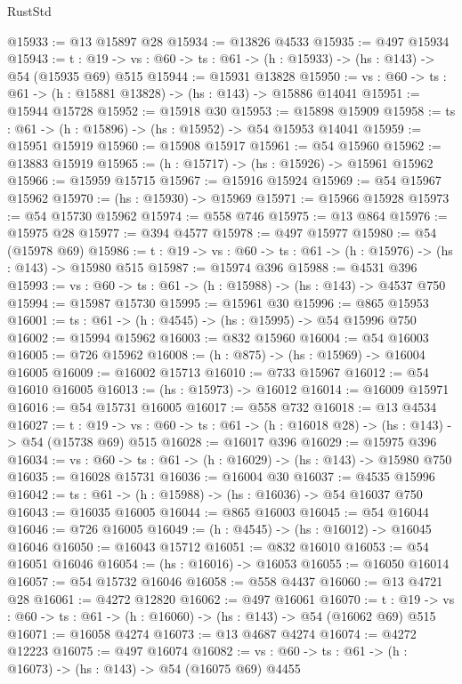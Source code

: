 \begin{lexlean}{RustStd}
\begin{coremodule}
@15933 := @13 @15897 @28
@15934 := @13826 @4533
@15935 := @497 @15934
@15943 := {t : @19} ->
  {vs : @60} -> {ts : @61} -> (h : @15933) -> (hs : @143) -> @54 (@15935 @69) @515
@15944 := @15931 @13828
@15950 := {vs : @60} -> {ts : @61} -> (h : @15881 @13828) -> (hs : @143) -> @15886 @14041
@15951 := @15944 @15728
@15952 := @15918 @30
@15953 := @15898 @15909
@15958 := {ts : @61} -> (h : @15896) -> (hs : @15952) -> @54 @15953 @14041
@15959 := @15951 @15919
@15960 := @15908 @15917
@15961 := @54 @15960
@15962 := @13883 @15919
@15965 := (h : @15717) -> (hs : @15926) -> @15961 @15962
@15966 := @15959 @15715
@15967 := @15916 @15924
@15969 := @54 @15967 @15962
@15970 := (hs : @15930) -> @15969
@15971 := @15966 @15928
@15973 := @54 @15730 @15962
@15974 := @558 @746
@15975 := @13 @864
@15976 := @15975 @28
@15977 := @394 @4577
@15978 := @497 @15977
@15980 := @54 (@15978 @69)
@15986 := {t : @19} -> {vs : @60} -> {ts : @61} -> (h : @15976) -> (hs : @143) -> @15980 @515
@15987 := @15974 @396
@15988 := @4531 @396
@15993 := {vs : @60} -> {ts : @61} -> (h : @15988) -> (hs : @143) -> @4537 @750
@15994 := @15987 @15730
@15995 := @15961 @30
@15996 := @865 @15953
@16001 := {ts : @61} -> (h : @4545) -> (hs : @15995) -> @54 @15996 @750
@16002 := @15994 @15962
@16003 := @832 @15960
@16004 := @54 @16003
@16005 := @726 @15962
@16008 := (h : @875) -> (hs : @15969) -> @16004 @16005
@16009 := @16002 @15713
@16010 := @733 @15967
@16012 := @54 @16010 @16005
@16013 := (hs : @15973) -> @16012
@16014 := @16009 @15971
@16016 := @54 @15731 @16005
@16017 := @558 @732
@16018 := @13 @4534
@16027 := {t : @19} ->
  {vs : @60} -> {ts : @61} -> (h : @16018 @28) -> (hs : @143) -> @54 (@15738 @69) @515
@16028 := @16017 @396
@16029 := @15975 @396
@16034 := {vs : @60} -> {ts : @61} -> (h : @16029) -> (hs : @143) -> @15980 @750
@16035 := @16028 @15731
@16036 := @16004 @30
@16037 := @4535 @15996
@16042 := {ts : @61} -> (h : @15988) -> (hs : @16036) -> @54 @16037 @750
@16043 := @16035 @16005
@16044 := @865 @16003
@16045 := @54 @16044
@16046 := @726 @16005
@16049 := (h : @4545) -> (hs : @16012) -> @16045 @16046
@16050 := @16043 @15712
@16051 := @832 @16010
@16053 := @54 @16051 @16046
@16054 := (hs : @16016) -> @16053
@16055 := @16050 @16014
@16057 := @54 @15732 @16046
@16058 := @558 @4437
@16060 := @13 @4721 @28
@16061 := @4272 @12820
@16062 := @497 @16061
@16070 := {t : @19} ->
  {vs : @60} -> {ts : @61} -> (h : @16060) -> (hs : @143) -> @54 (@16062 @69) @515
@16071 := @16058 @4274
@16073 := @13 @4687 @4274
@16074 := @4272 @12223
@16075 := @497 @16074
@16082 := {vs : @60} -> {ts : @61} -> (h : @16073) -> (hs : @143) -> @54 (@16075 @69) @4455

\end{coremodule}
\end{lexlean}
